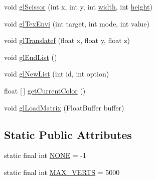 \begin{DoxyCompactItemize}
\item 
void \mbox{\hyperlink{classorg_1_1newdawn_1_1slick_1_1opengl_1_1renderer_1_1_v_a_o_g_l_renderer_a496a073a0a3dea08b3fbace7673d6b29}{gl\+Scissor}} (int x, int y, int \mbox{\hyperlink{classorg_1_1newdawn_1_1slick_1_1opengl_1_1renderer_1_1_immediate_mode_o_g_l_renderer_a65d0a04d747368ea954f69074d9102d6}{width}}, int \mbox{\hyperlink{classorg_1_1newdawn_1_1slick_1_1opengl_1_1renderer_1_1_immediate_mode_o_g_l_renderer_aec68994a0ee3b7b478122af823c8a8d7}{height}})
\item 
void \mbox{\hyperlink{classorg_1_1newdawn_1_1slick_1_1opengl_1_1renderer_1_1_v_a_o_g_l_renderer_a4827ab4e89a258c0343dbf1e0e87ecfd}{gl\+Tex\+Envi}} (int target, int mode, int value)
\item 
void \mbox{\hyperlink{classorg_1_1newdawn_1_1slick_1_1opengl_1_1renderer_1_1_v_a_o_g_l_renderer_aecc3fbcdf0f59be0faf26a4f98a67c51}{gl\+Translatef}} (float x, float y, float z)
\item 
void \mbox{\hyperlink{classorg_1_1newdawn_1_1slick_1_1opengl_1_1renderer_1_1_v_a_o_g_l_renderer_abc1608fbc94c9ad4101ed15cea4e66ef}{gl\+End\+List}} ()
\item 
void \mbox{\hyperlink{classorg_1_1newdawn_1_1slick_1_1opengl_1_1renderer_1_1_v_a_o_g_l_renderer_af106842219b6ad234609527d83f24e6b}{gl\+New\+List}} (int id, int option)
\item 
float \mbox{[}$\,$\mbox{]} \mbox{\hyperlink{classorg_1_1newdawn_1_1slick_1_1opengl_1_1renderer_1_1_v_a_o_g_l_renderer_ab36435be5d5f256e10210a6a6b322727}{get\+Current\+Color}} ()
\item 
void \mbox{\hyperlink{classorg_1_1newdawn_1_1slick_1_1opengl_1_1renderer_1_1_v_a_o_g_l_renderer_ac5401989bccd77b9d35db9b998d5fa4c}{gl\+Load\+Matrix}} (Float\+Buffer buffer)
\end{DoxyCompactItemize}
\subsection*{Static Public Attributes}
\begin{DoxyCompactItemize}
\item 
static final int \mbox{\hyperlink{classorg_1_1newdawn_1_1slick_1_1opengl_1_1renderer_1_1_v_a_o_g_l_renderer_a3344bc9e570edaaaf4ee44af3b73f32a}{N\+O\+NE}} = -\/1
\item 
static final int \mbox{\hyperlink{classorg_1_1newdawn_1_1slick_1_1opengl_1_1renderer_1_1_v_a_o_g_l_renderer_ada536ce7ada01eb56efbcb3e883c2b3f}{M\+A\+X\+\_\+\+V\+E\+R\+TS}} = 5000
\end{DoxyCompactItemize}
